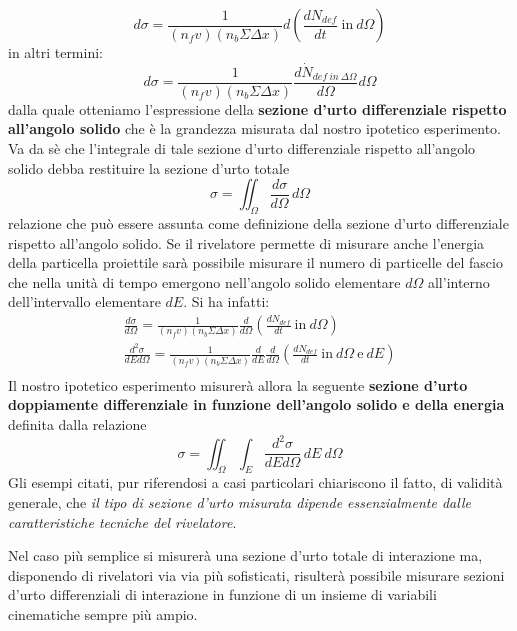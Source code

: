 \[
	d \sigma = \frac{1}{(n_fv)(n_b \Sigma \Delta x)}d \left( \frac{dN_{def}}{dt} \ \text{in} \ d\Omega\right)
\]
in altri termini:
\[
	d \sigma = \frac{1}{(n_fv)(n_b \Sigma \Delta x)} \frac{d\dot{N}_{def \ in \ \Delta \Omega}}{d \Omega} d \Omega
\]
dalla quale otteniamo l'espressione della \textbf{sezione d'urto
differenziale rispetto all'angolo solido} che è la grandezza misurata
dal nostro ipotetico esperimento.
Va da sè che l'integrale di tale
sezione d'urto differenziale rispetto all'angolo solido debba restituire
la sezione d'urto totale
\begin{equation}
	\boxed{ \sigma = \iint_{\Omega}\frac{d \sigma}{d \Omega} \, d \Omega }
	\label{eq:cross-section-solid-angle}
\end{equation}
relazione che può essere assunta come definizione della sezione d'urto
differenziale rispetto all'angolo solido.
Se il rivelatore permette di misurare anche l'energia della particella proiettile sarà possibile
misurare il numero di particelle del fascio che nella unità di tempo
emergono nell'angolo solido elementare \(d \Omega\) all'interno
dell'intervallo elementare \(dE\).
Si ha infatti:
\begin{gather*}
	\frac{d \sigma}{d \Omega} = \frac{1}{(n_fv)(n_b \Sigma \Delta x)}\frac{d}{d \Omega} \left( \frac{dN_{def}}{dt} \ \text{in} \ d\Omega\right)\\
	\frac{d^2 \sigma}{dE d \Omega} = \frac{1}{(n_fv)(n_b \Sigma \Delta x)}\frac{d}{dE}\frac{d}{d \Omega} \left( \frac{dN_{def}}{dt} \ \text{in} \ d\Omega \ \text{e} \ dE\right)\\
\end{gather*}
Il nostro ipotetico esperimento misurerà allora la seguente
\textbf{sezione d'urto doppiamente differenziale in funzione dell'angolo
solido e della energia} definita dalla relazione
\[
	\sigma = \iint_{\Omega}\int_{E} \frac{d^2 \sigma}{dE d \Omega} \, dE \ d \Omega
\]
Gli esempi citati, pur riferendosi a casi particolari chiariscono il fatto, di validità generale, che \emph{il tipo di sezione d'urto misurata dipende essenzialmente dalle caratteristiche tecniche del rivelatore}.

Nel caso più semplice si misurerà una sezione d'urto totale di interazione ma, disponendo di rivelatori via via più sofisticati, risulterà possibile misurare sezioni d'urto differenziali di interazione in funzione di un insieme di variabili cinematiche sempre più ampio.

